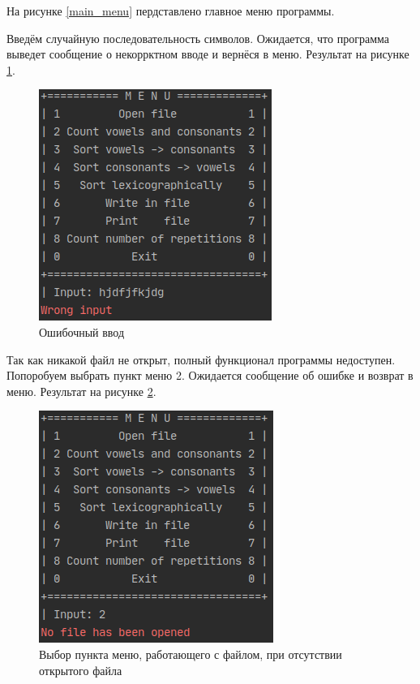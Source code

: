 \documentclass[12pt,a4paper]{article}  %
\begin{document}
На рисунке \ref{main_menu} пердставлено главное меню программы.

Введём случайную последовательность символов. Ожидается, что программа выведет сообщение о некоррктном вводе и вернёся в меню. Результат на рисунке \ref{wrong_input}.
\begin{figure}[htp!]
	\centering
	\includegraphics[width=0.5\linewidth]{photo/tests/wrong_input}
	\caption{Ошибочный ввод}
	\label{wrong_input}
\end{figure}

Так как никакой файл не открыт, полный функционал программы недоступен. Попоробуем выбрать пункт меню 2. Ожидается сообщение об ошибке и возврат в меню. Результат на рисунке \ref{no_file_opened}.
\begin{figure}[hpt!]
	\centering
	\includegraphics[width=0.5\linewidth]{photo/tests/no_file_opened}
	\caption{Выбор пункта меню, работающего с файлом, при отсутствии открытого файла}
	\label{no_file_opened}
\end{figure}
\end{document}
